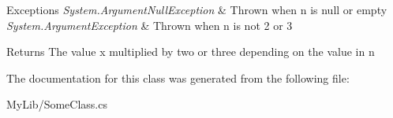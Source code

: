 \begin{DoxyExceptions}{Exceptions}
{\em System.\+Argument\+Null\+Exception} & Thrown when n is null or empty\\
\hline
{\em System.\+Argument\+Exception} & Thrown when n is not \textquotesingle{}2\textquotesingle{} or \textquotesingle{}3\textquotesingle{}\\
\hline
\end{DoxyExceptions}
\begin{DoxyReturn}{Returns}
The value x multiplied by two or three depending on the value in n
\end{DoxyReturn}


The documentation for this class was generated from the following file\+:\begin{DoxyCompactItemize}
\item 
My\+Lib/Some\+Class.\+cs\end{DoxyCompactItemize}
